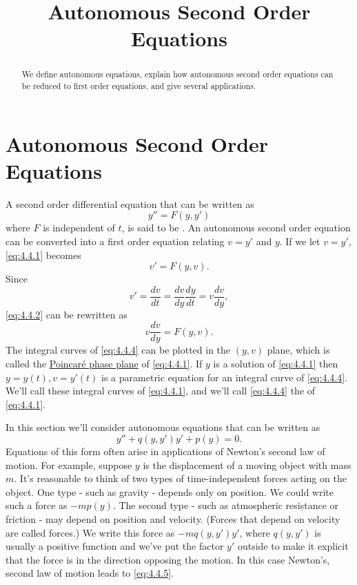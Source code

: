 \documentclass{ximera}
\title{Autonomous Second Order Equations}%
\begin{document}
 
\begin{abstract}
 We define autonomous equations, explain how autonomous second order equations can be reduced to first order equations, and give several applications.
\end{abstract}
 
\maketitle
 
\section*{Autonomous Second Order Equations}
 
A second order differential equation that can be written as
\begin{equation} \label{eq:4.4.1}
y''=F(y,y')
\end{equation}
where $F$ is independent of $t$, is said to be .
An autonomous second order equation can be converted into a first
order equation relating $v=y'$ and $y$. If we let $v=y'$,
\eqref{eq:4.4.1} becomes
\begin{equation} \label{eq:4.4.2}
v'=F(y,v).
\end{equation}
Since
\begin{equation} \label{eq:4.4.3}
v'=\frac{dv}{dt}=\frac{dv}{dy}\frac{dy}{dt}=v\frac{dv}{dy},
\end{equation}
\eqref{eq:4.4.2} can be rewritten as
\begin{equation} \label{eq:4.4.4}
v\frac{dv}{dy}=F(y,v).
\end{equation}
The integral curves of \eqref{eq:4.4.4} can be plotted in the $(y,v)$
plane, which is called the
\href{http://www-history.mcs.st-and.ac.uk/Mathematicians/Poincare.html}{Poincar\'e phase plane} of \eqref{eq:4.4.1}. If $y$ is a solution of
\eqref{eq:4.4.1}
then $y=y(t), v=y'(t)$ is a parametric equation for an integral curve
of \eqref{eq:4.4.4}. We'll call these integral curves  of \eqref{eq:4.4.1}, and we'll call
\eqref{eq:4.4.4} the  of \eqref{eq:4.4.1}.
 
In this section we'll consider  autonomous equations
that can be written as
\begin{equation} \label{eq:4.4.5}
y''+q(y,y')y'+p(y)=0.
\end{equation}
Equations of this form often arise in applications of Newton's second
law of motion. For example, suppose  $y$ is the displacement of a
moving object with mass $m$. It's  reasonable to think of two
types of time-independent forces acting on the object. One type - such
as gravity - depends only on position. We could write such a force as
$-mp(y)$. The second type - such as atmospheric resistance or friction
- may depend on position and velocity. (Forces that depend on velocity
are called  forces.) We  write this force as
$-mq(y,y')y'$, where $q(y,y')$ is usually a positive function and
we've put the factor $y'$ outside  to make it
explicit that the force
is in the direction opposing the motion. In this case Newton's, second
law of motion leads to \eqref{eq:4.4.5}.
 
\end{document}
